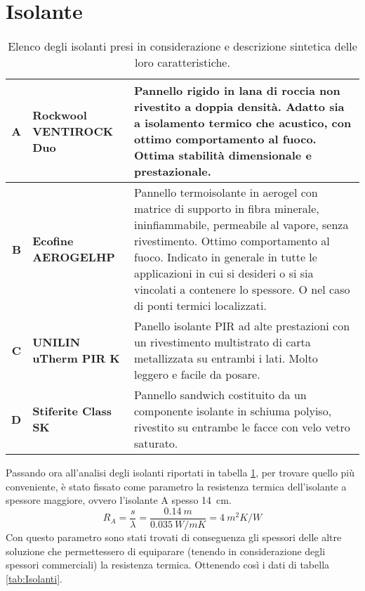 \section{Isolante}
\begin{table}[htbp]
\caption{Elenco degli isolanti presi in considerazione e descrizione sintetica delle loro caratteristiche.}
\label{MaterialiISO}
\centering
\begin{tabularx}{\textwidth}{rXX}
    \toprule
        \textbf{A} & \textbf{Rockwool VENTIROCK Duo} & Pannello rigido in lana di roccia non rivestito a doppia densità. 
        Adatto sia a isolamento termico che acustico, con ottimo comportamento al fuoco. 
        Ottima stabilità dimensionale e prestazionale. \\\midrule
        \textbf{B} & \textbf{Ecofine AEROGELHP} & Pannello termoisolante in aerogel con matrice di supporto in fibra minerale, ininfiammabile, permeabile al vapore, senza rivestimento. 
        Ottimo comportamento al fuoco. 
        Indicato in generale in tutte le applicazioni in cui si desideri o si sia vincolati a contenere lo spessore. O nel caso di ponti termici localizzati.\\\midrule
        \textbf{C} & \textbf{UNILIN uTherm PIR K} & Panello isolante PIR ad alte prestazioni con un rivestimento multistrato di carta metallizzata su entrambi i lati. 
        Molto leggero e facile da posare.\\\midrule
        \textbf{D} & \textbf{Stiferite Class SK} & Pannello sandwich costituito da un componente isolante in schiuma polyiso, rivestito su entrambe le facce con velo vetro saturato.\\
    \bottomrule
\end{tabularx}
\end{table}
Passando ora all'analisi degli isolanti riportati in tabella \ref{MaterialiISO}, per trovare quello più conveniente, è stato fissato come parametro la resistenza termica dell'isolante a spessore maggiore, ovvero l'isolante A spesso \SI{14}{\centi\metre}.
\[R_A = \frac{s}{\lambda}=\frac{\SI{0.14}{m}}{\SI{0.035}{W/mK}}=\SI{4}{m^2K\per W}\]
Con questo parametro sono stati trovati di conseguenza gli spessori delle altre soluzione che permettessero di equiparare (tenendo in considerazione degli spessori commerciali) la resistenza termica. 
Ottenendo così i dati di tabella \ref{tab:Isolanti}.
